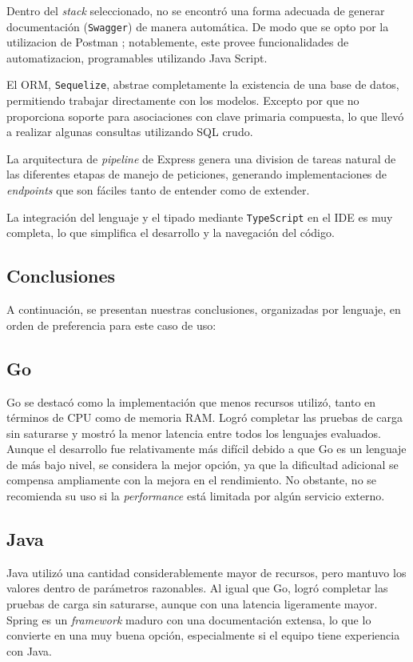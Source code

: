 \documentclass[11pt]{article}
\let\Oldsubsection\subsection
\renewcommand{\subsection}{\FloatBarrier\Oldsubsection}
\newcommand{\english}[1]{\textit{#1}}
\begin{document}
Dentro del \english{stack} seleccionado, no se encontró una forma adecuada de generar documentación (\lstinline{Swagger}) de manera automática. De modo que se opto por la utilizacion de Postman \cite{js:ex:postman}; notablemente, este provee funcionalidades de automatizacion, programables utilizando Java Script.

El ORM, \lstinline{Sequelize}, abstrae completamente la existencia de una base de datos, permitiendo trabajar directamente con los modelos. Excepto por que no proporciona soporte para asociaciones con clave primaria compuesta, lo que llevó a realizar algunas consultas utilizando SQL crudo.

La arquitectura de \english{pipeline} de Express genera una division de tareas natural de las diferentes etapas de manejo de peticiones, generando implementaciones de \english{endpoints} que son fáciles tanto de entender como de extender.

La integración del lenguaje y el tipado mediante \lstinline{TypeScript} en el IDE es muy completa, lo que simplifica el desarrollo y la navegación del código.

\subsection{Conclusiones}

A continuación, se presentan nuestras conclusiones, organizadas por lenguaje, en orden de preferencia para este caso de uso:

\subsection{Go}
Go se destacó como la implementación que menos recursos utilizó, tanto en términos de CPU como de memoria RAM. Logró completar las pruebas de carga sin saturarse y mostró la menor latencia entre todos los lenguajes evaluados. Aunque el desarrollo fue relativamente más difícil debido a que Go es un lenguaje de más bajo nivel, se considera la mejor opción, ya que la dificultad adicional se compensa ampliamente con la mejora en el rendimiento. No obstante, no se recomienda su uso si la \english{performance} está limitada por algún servicio externo.

\subsection{Java}
Java utilizó una cantidad considerablemente mayor de recursos, pero mantuvo los valores dentro de parámetros razonables. Al igual que Go, logró completar las pruebas de carga sin saturarse, aunque con una latencia ligeramente mayor. Spring es un \textit{framework} maduro con una documentación extensa, lo que lo convierte en una muy buena opción, especialmente si el equipo tiene experiencia con Java.
\end{document}

